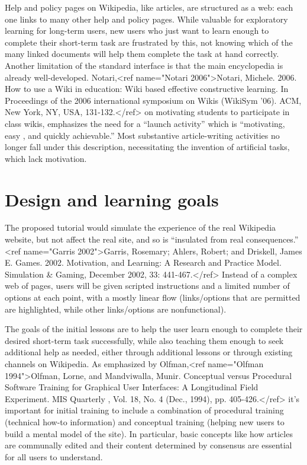 \documentclass{acm_proc_article-sp}
\begin{document}
Help and policy pages on Wikipedia, like articles, are structured as a web: each one links to many other help and policy pages. While valuable for exploratory learning for long-term users, new users who just want to learn enough to complete their short-term task are frustrated by this, not knowing which of the many linked documents will help them complete the task at hand correctly.
Another limitation of the standard interface is that the main encyclopedia is already well-developed. Notari,<ref name="Notari 2006">Notari, Michele. 2006. How to use a Wiki in education: Wiki based effective constructive learning. In Proceedings of the 2006 international symposium on Wikis (WikiSym '06). ACM, New York, NY, USA, 131-132.</ref> on motivating students to participate in class wikis, emphasizes the need for a “launch activity” which is “motivating, easy , and quickly achievable.” Most substantive article-writing activities no longer fall under this description, necessitating the invention of artificial tasks, which lack motivation.

\section{Design and learning goals}

The proposed tutorial would simulate the experience of the real Wikipedia website, but not affect the real site, and so is “insulated from real consequences.” <ref name="Garris 2002">Garris, Rosemary; Ahlers, Robert; and Driskell, James E. Games. 2002. Motivation, and Learning: A Research and Practice Model. Simulation \& Gaming, December 2002, 33: 441-467.</ref> Instead of a complex web of pages, users will be given scripted instructions and a limited number of options at each point, with a mostly linear flow (links/options that are permitted are highlighted, while other links/options are nonfunctional).

The goals of the initial lessons are to help the user learn enough to complete their desired short-term task successfully, while also teaching them enough to seek additional help as needed, either through additional lessons or through existing channels on Wikipedia. As emphasized by Olfman,<ref name="Olfman 1994">Olfman, Lorne, and Mandviwalla, Munir. Conceptual versus Procedural Software Training for Graphical User Interfaces: A Longitudinal Field Experiment. MIS Quarterly , Vol. 18, No. 4 (Dec., 1994), pp. 405-426.</ref> it's important for initial training to include a combination of procedural training (technical how-to information) and conceptual training (helping new users to build a mental model of the site). In particular, basic concepts like how articles are communally edited and their content determined by consensus are essential for all users to understand.
\end{document}
